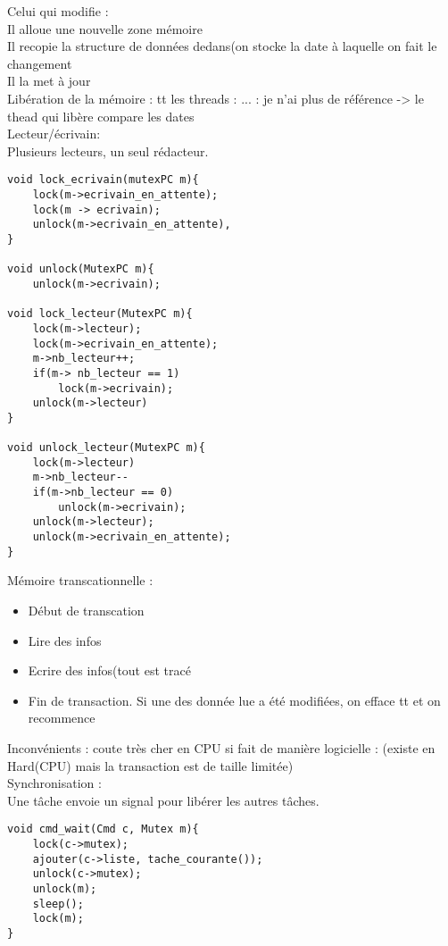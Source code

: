 \documentclass{article}
\begin{document}
Celui qui modifie :\\
Il alloue une nouvelle zone mémoire\\
Il recopie la structure de données dedans(on stocke la date à laquelle on fait le changement \\
Il la met à jour\\
Libération de la mémoire : tt les threads : ...  : je n'ai plus de référence -> le thead qui libère compare les dates\\

\vskip 1cm
Lecteur/écrivain:\\
Plusieurs lecteurs, un seul rédacteur.\\
\begin{verbatim}
void lock_ecrivain(mutexPC m){
	lock(m->ecrivain_en_attente);
	lock(m -> ecrivain);
	unlock(m->ecrivain_en_attente),
}

void unlock(MutexPC m){
	unlock(m->ecrivain);

void lock_lecteur(MutexPC m){
	lock(m->lecteur);
	lock(m->ecrivain_en_attente);
	m->nb_lecteur++;
	if(m-> nb_lecteur == 1)
		lock(m->ecrivain);
	unlock(m->lecteur)
}

void unlock_lecteur(MutexPC m){
	lock(m->lecteur)
	m->nb_lecteur--
	if(m->nb_lecteur == 0)
		unlock(m->ecrivain);
	unlock(m->lecteur);
	unlock(m->ecrivain_en_attente);
}
\end{verbatim}

\vskip 1cm
Mémoire transcationnelle :\\
\begin{itemize}
	\item Début de transcation
	\item Lire des infos
	\item Ecrire des infos(tout est tracé
	\item Fin de transaction. Si une des donnée lue a été modifiées, on efface tt et on recommence
\end{itemize}

Inconvénients : coute très cher en CPU si fait de manière logicielle : (existe en Hard(CPU) mais la transaction est de taille limitée)\\

\vskip 1cm
Synchronisation :\\
Une tâche envoie un signal pour libérer les autres tâches.\\
\begin{verbatim}
void cmd_wait(Cmd c, Mutex m){
	lock(c->mutex);
	ajouter(c->liste, tache_courante());
	unlock(c->mutex);
	unlock(m);
	sleep();
	lock(m);
}
\end{verbatim}
\vskip 1cm
\end{document}
